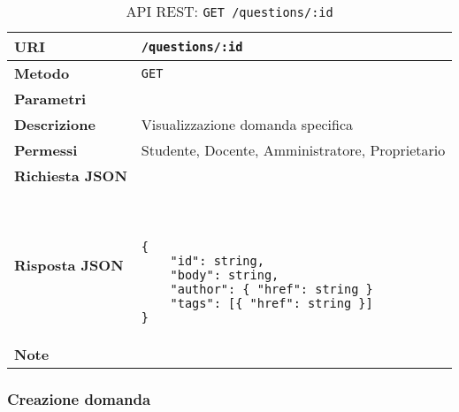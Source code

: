         \begin{table}[H]
            \begin{center}
                \begin{tabular}{p{} p{}}
                    \toprule
                    \textbf{URI} & \texttt{/questions/:id} \\ \midrule
                    \textbf{Metodo} & \texttt{GET} \\ \midrule
                    \textbf{Parametri} & \\ \midrule
                    \textbf{Descrizione} & Visualizzazione domanda specifica \\ \midrule
                    \textbf{Permessi} & Studente, Docente, Amministratore, Proprietario  \\ \midrule
                    \textbf{Richiesta JSON} & \\ \midrule
                    \textbf{Risposta JSON} & \
                        \begin{lstlisting}[basicstyle={\ttfamily}]
{
    "id": string,
    "body": string,
    "author": { "href": string }
    "tags": [{ "href": string }]
}
                        \end{lstlisting}
                        \\ \midrule
                    \textbf{Note} & \\
                    \bottomrule
                \end{tabular}
                \caption{API REST: \texttt{GET /questions/:id}}
            \end{center}
        \end{table}

    \subsubsection{Creazione domanda}

